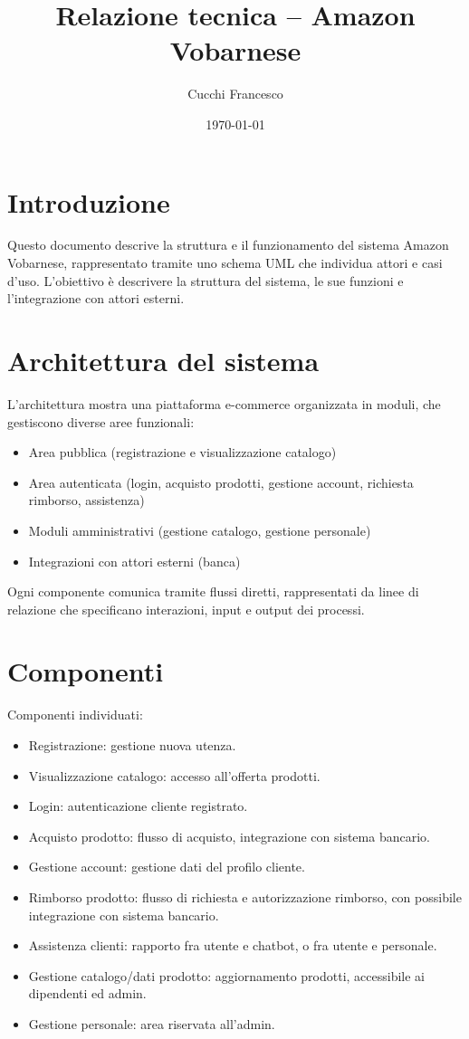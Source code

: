 \documentclass[a4paper,12pt]{article}
\title{Relazione tecnica – Amazon Vobarnese}
\author{Cucchi Francesco}
\date{\today}
\begin{document}
\maketitle

\section{Introduzione}
Questo documento descrive la struttura e il funzionamento del sistema Amazon Vobarnese, rappresentato tramite uno schema UML che individua attori e casi d'uso. L’obiettivo è descrivere la struttura del sistema, le sue funzioni e l’integrazione con attori esterni.

\section{Architettura del sistema}
L’architettura mostra una piattaforma e-commerce organizzata in moduli, che gestiscono diverse aree funzionali:
\begin{itemize}
  \item Area pubblica (registrazione e visualizzazione catalogo)
  \item Area autenticata (login, acquisto prodotti, gestione account, richiesta rimborso, assistenza)
  \item Moduli amministrativi (gestione catalogo, gestione personale)
  \item Integrazioni con attori esterni (banca)
\end{itemize}
Ogni componente comunica tramite flussi diretti, rappresentati da linee di relazione che specificano interazioni, input e output dei processi.

\section{Componenti}
Componenti individuati:
\begin{itemize}
  \item Registrazione: gestione nuova utenza.
  \item Visualizzazione catalogo: accesso all’offerta prodotti.
  \item Login: autenticazione cliente registrato.
  \item Acquisto prodotto: flusso di acquisto, integrazione con sistema bancario.
  \item Gestione account: gestione dati del profilo cliente.
  \item Rimborso prodotto: flusso di richiesta e autorizzazione rimborso, con possibile integrazione con sistema bancario.
  \item Assistenza clienti: rapporto fra utente e chatbot, o fra utente e personale.
  \item Gestione catalogo/dati prodotto: aggiornamento prodotti, accessibile ai dipendenti ed admin.
  \item Gestione personale: area riservata all’admin.
\end{itemize}
\end{document}
